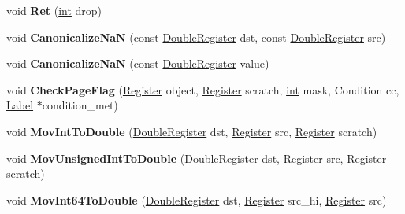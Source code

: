 \begin{DoxyCompactItemize}
void {\bfseries Ret} (\mbox{\hyperlink{classint}{int}} drop)
\item 
\mbox{\label{classv8_1_1internal_1_1TurboAssembler_adb248502face4ee843083cf7cd3b46ae}} 
void {\bfseries Canonicalize\+NaN} (const \mbox{\hyperlink{classv8_1_1internal_1_1DoubleRegister}{Double\+Register}} dst, const \mbox{\hyperlink{classv8_1_1internal_1_1DoubleRegister}{Double\+Register}} src)
\item 
\mbox{\label{classv8_1_1internal_1_1TurboAssembler_a4bab5208d936b63a520816c5d7b76c03}} 
void {\bfseries Canonicalize\+NaN} (const \mbox{\hyperlink{classv8_1_1internal_1_1DoubleRegister}{Double\+Register}} value)
\item 
\mbox{\label{classv8_1_1internal_1_1TurboAssembler_a1fa4aee7654610ffc02bdac3ddd102c3}} 
void {\bfseries Check\+Page\+Flag} (\mbox{\hyperlink{classv8_1_1internal_1_1Register}{Register}} object, \mbox{\hyperlink{classv8_1_1internal_1_1Register}{Register}} scratch, \mbox{\hyperlink{classint}{int}} mask, Condition cc, \mbox{\hyperlink{classv8_1_1internal_1_1Label}{Label}} $\ast$condition\+\_\+met)
\item 
\mbox{\label{classv8_1_1internal_1_1TurboAssembler_a078864a2972048ccc5206db3d369f33f}} 
void {\bfseries Mov\+Int\+To\+Double} (\mbox{\hyperlink{classv8_1_1internal_1_1DoubleRegister}{Double\+Register}} dst, \mbox{\hyperlink{classv8_1_1internal_1_1Register}{Register}} src, \mbox{\hyperlink{classv8_1_1internal_1_1Register}{Register}} scratch)
\item 
\mbox{\label{classv8_1_1internal_1_1TurboAssembler_a3f4939e90115689d6882602ea546a29e}} 
void {\bfseries Mov\+Unsigned\+Int\+To\+Double} (\mbox{\hyperlink{classv8_1_1internal_1_1DoubleRegister}{Double\+Register}} dst, \mbox{\hyperlink{classv8_1_1internal_1_1Register}{Register}} src, \mbox{\hyperlink{classv8_1_1internal_1_1Register}{Register}} scratch)
\item 
\mbox{\label{classv8_1_1internal_1_1TurboAssembler_adf1aae1059b3d4eb32a96914c3e91a8f}} 
void {\bfseries Mov\+Int64\+To\+Double} (\mbox{\hyperlink{classv8_1_1internal_1_1DoubleRegister}{Double\+Register}} dst, \mbox{\hyperlink{classv8_1_1internal_1_1Register}{Register}} src\+\_\+hi, \mbox{\hyperlink{classv8_1_1internal_1_1Register}{Register}} src)

\end{DoxyCompactItemize}
